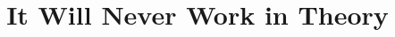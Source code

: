 \documentclass[10pt]{article}
\title{It Will Never Work in Theory}
\begin{document}
\maketitle
\nocite{*}


\end{document}
